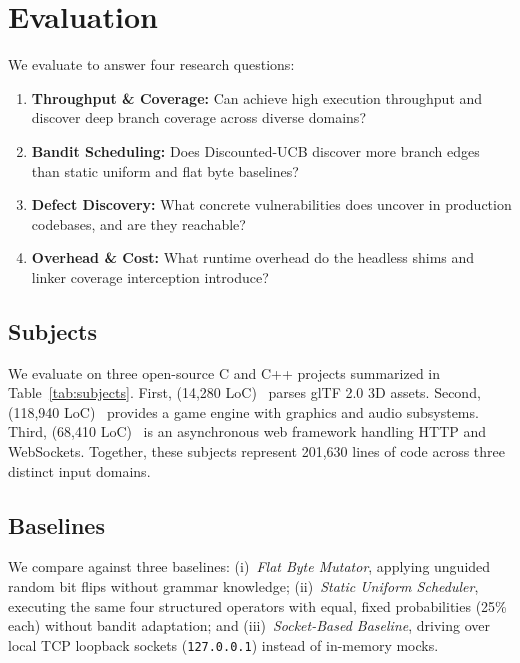 \section{Evaluation}
\label{sec:eval}

We evaluate \tool to answer four research questions:
\begin{enumerate}[label=\textbf{RQ\arabic*:},leftmargin=*]
  \item \textbf{Throughput \& Coverage:} Can \tool achieve high execution throughput and discover deep branch coverage across diverse domains?
  \item \textbf{Bandit Scheduling:} Does Discounted-UCB discover more branch edges than static uniform and flat byte baselines?
  \item \textbf{Defect Discovery:} What concrete vulnerabilities does \tool uncover in production codebases, and are they reachable?
  \item \textbf{Overhead \& Cost:} What runtime overhead do the headless shims and linker coverage interception introduce?
\end{enumerate}



\subsection{Subjects}
\label{sec:subjects}
We evaluate \tool on three open-source C and C++ projects summarized in Table~\ref{tab:subjects}.
First, \textbf{\fastgltf} (14{,}280 LoC)~\cite{fastgltf_repo} parses glTF 2.0 3D assets.
Second, \textbf{\raylib} (118{,}940 LoC)~\cite{raylib_repo} provides a game engine with graphics and audio subsystems.
Third, \textbf{\drogon} (68{,}410 LoC)~\cite{drogon_repo} is an asynchronous web framework handling HTTP and WebSockets.
Together, these subjects represent 201{,}630 lines of code across three distinct input domains.

\subsection{Baselines}
\label{sec:baselines}
We compare \tool against three baselines:
(i)~\emph{Flat Byte Mutator}, applying unguided random bit flips without grammar knowledge;
(ii)~\emph{Static Uniform Scheduler}, executing the same four structured operators with equal, fixed probabilities (25\% each) without bandit adaptation; and
(iii)~\emph{Socket-Based Baseline}, driving \drogon over local TCP loopback sockets (\texttt{127.0.0.1}) instead of in-memory mocks.

